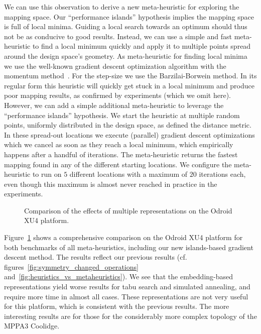 We can use this observation to derive a new meta-heuristic for exploring the mapping space.
Our ``performance islands'' hypothesis implies the mapping space is full of local minima.
Guiding a local search towards an optimum should thus not be as conducive to good results.
Instead, we can use a simple and fast meta-heuristic to find a local minimum quickly and apply it to multiple points spread around the design space's geometry. 
As meta-heuristic for finding local minima we use the well-known gradient descent optimization algorithm with the momentum method~\cite{rumelhart1986learning}.
For the step-size we use the Barzilai-Borwein \cite{barzilai1988two} method.
In its regular form this heuristic will quickly get stuck in a local minimum and produce poor mapping results, as confirmed by experiments (which we omit here).
However, we can add a simple additional meta-heuristic to leverage the ``performance islands'' hypothesis.
We start the heuristic at multiple random points, uniformly distributed in the design space, as defined the distance metric.
In these spread-out locations we execute (parallel) gradient descent optimizations which we cancel as soon as they reach a local minimum, which empirically happens after a handful of iterations.
The meta-heuristic returns the fastest mapping found in any of the different starting locations.
We configure the meta-heuristic to run on $5$ different locations with a maximum of $20$ iterations each, even though this maximum is almost never reached in practice in the experiments.

\begin{figure}[h]
	\centering
   \resizebox{0.95\textwidth}{!}{}
	\caption{Comparison of the effects of multiple representations on the Odroid XU4 platform.}
	\label{fig:multiple_representations_exynos}
\end{figure}

Figure~\ref{fig:multiple_representations_exynos} shows a comprehensive comparison on the Odroid XU4 platform for both benchmarks of all meta-heuristics, including our new islands-based gradient descent method. 
The results reflect our previous results (cf. figures~\ref{fig:symmetry_changed_operations} and~\ref{fig:heuristics_vs_metaheuristics}).
We see that the embedding-based representations yield worse results for tabu search and simulated annealing, and require more time in almost all cases.
These representations are not very useful for this platform, which is consistent with the previous results.
The more interesting results are for those for the considerably more complex topology of the MPPA3 Coolidge.

